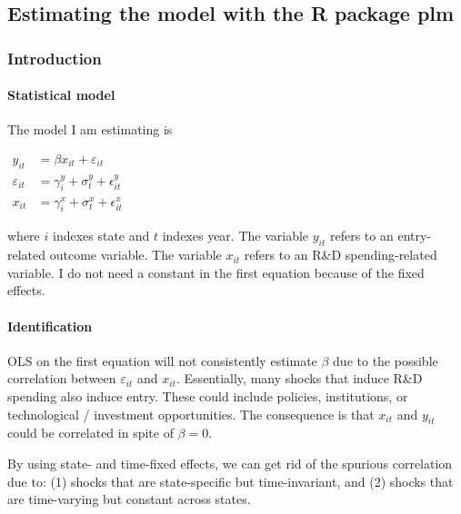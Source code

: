 \documentclass[11pt]{article}
\begin{document}
    \hypertarget{estimating-the-model-with-the-r-package-plm}{%
\subsection{Estimating the model with the R package
plm}\label{estimating-the-model-with-the-r-package-plm}}

    \hypertarget{introduction}{%
\subsubsection{Introduction}\label{introduction}}

    \hypertarget{statistical-model}{%
\paragraph{Statistical model}\label{statistical-model}}

The model I am estimating is

\(\begin{align} y_{it} &= \beta x_{it} + \varepsilon_{it} \\ \varepsilon_{it} &= \gamma^y_{i} + \sigma^y_{t} + \epsilon^y_{it} \\ x_{it} &= \gamma^x_i + \sigma^x_t + \epsilon^x_{it} \end{align}\)

where \(i\) indexes state and \(t\) indexes year. The variable
\(y_{it}\) refers to an entry-related outcome variable. The variable
\(x_{it}\) refers to an R\&D spending-related variable. I do not need a
constant in the first equation because of the fixed effects.

\hypertarget{identification}{%
\paragraph{Identification}\label{identification}}

OLS on the first equation will not consistently estimate \(\beta\) due
to the possible correlation between \(\varepsilon_{it}\) and \(x_{it}\).
Essentially, many shocks that induce R\&D spending also induce entry.
These could include policies, institutions, or technological /
investment opportunities. The consequence is that \(x_{it}\) and
\(y_{it}\) could be correlated in spite of \(\beta = 0\).

By using state- and time-fixed effects, we can get rid of the spurious
correlation due to: (1) shocks that are state-specific but
time-invariant, and (2) shocks that are time-varying but constant across
states.
\end{document}
